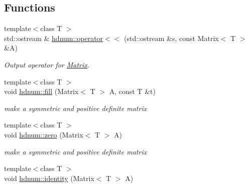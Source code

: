 \subsection*{Functions}
\begin{DoxyCompactItemize}
\item 
\hypertarget{namespacehdnum_a15b5d1eb1cda976e18e24c398cd92ffa}{
{\footnotesize template$<$class T $>$ }\\std::ostream \& \hyperlink{namespacehdnum_a15b5d1eb1cda976e18e24c398cd92ffa}{hdnum::operator$<$$<$} (std::ostream \&s, const Matrix$<$ T $>$ \&A)}
\label{namespacehdnum_a15b5d1eb1cda976e18e24c398cd92ffa}

\begin{DoxyCompactList}\small\item\em Output operator for \hyperlink{classhdnum_1_1Matrix}{Matrix}. \item\end{DoxyCompactList}\item 
\hypertarget{namespacehdnum_a9810527efdf8a8ed0c55079c564c8d33}{
{\footnotesize template$<$class T $>$ }\\void \hyperlink{namespacehdnum_a9810527efdf8a8ed0c55079c564c8d33}{hdnum::fill} (Matrix$<$ T $>$ A, const T \&t)}
\label{namespacehdnum_a9810527efdf8a8ed0c55079c564c8d33}

\begin{DoxyCompactList}\small\item\em make a symmetric and positive definite matrix \item\end{DoxyCompactList}\item 
\hypertarget{namespacehdnum_ac390c852887cfb333968821bae81c1e5}{
{\footnotesize template$<$class T $>$ }\\void \hyperlink{namespacehdnum_ac390c852887cfb333968821bae81c1e5}{hdnum::zero} (Matrix$<$ T $>$ A)}
\label{namespacehdnum_ac390c852887cfb333968821bae81c1e5}

\begin{DoxyCompactList}\small\item\em make a symmetric and positive definite matrix \item\end{DoxyCompactList}\item 
\hypertarget{namespacehdnum_af7a9168872df38eb909d28a441a1d423}{
{\footnotesize template$<$class T $>$ }\\void \hyperlink{namespacehdnum_af7a9168872df38eb909d28a441a1d423}{hdnum::identity} (Matrix$<$ T $>$ A)}
\label{namespacehdnum_af7a9168872df38eb909d28a441a1d423}


\end{DoxyCompactItemize}
